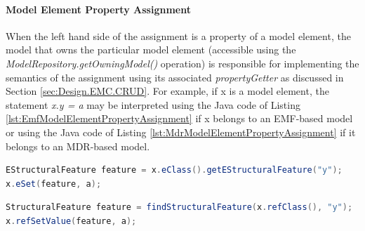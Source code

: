 \paragraph{Model Element Property Assignment}

When the left hand side of the assignment is a property of a model element, the model that owns the particular model element (accessible using the \emph{ModelRepository.getOwningModel() }operation) is responsible for implementing the semantics of the assignment using its associated \emph{propertyGetter} as discussed in Section \ref{sec:Design.EMC.CRUD}. For example, if x is a model element, the statement \emph{x.y = a} may be interpreted using the Java code of Listing \ref{lst:EmfModelElementPropertyAssignment} if x belongs to an EMF-based model or using the Java code of Listing \ref{lst:MdrModelElementPropertyAssignment} if it belongs to an MDR-based model.

\begin{lstlisting}[basicstyle=\ttfamily\footnotesize, flexiblecolumns=true, numbers=none, nolol=true, caption=Java code that assigns the value of a property of a model element that belongs to an EMF-based model, label=lst:EmfModelElementPropertyAssignment, numbers=left, language=Java, tabsize=2]
EStructuralFeature feature = x.eClass().getEStructuralFeature("y");
x.eSet(feature, a);
\end{lstlisting}

\begin{lstlisting}[basicstyle=\ttfamily\footnotesize, flexiblecolumns=true, numbers=none, nolol=true, caption=Java code that assigns the value of a property of a model element that belongs to an MDR-based model, label=lst:MdrModelElementPropertyAssignment, numbers=left, language=Java, tabsize=2]
StructuralFeature feature = findStructuralFeature(x.refClass(), "y");
x.refSetValue(feature, a);
\end{lstlisting}

